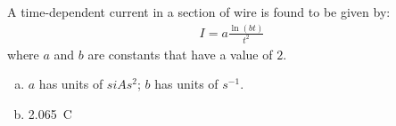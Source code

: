 \question A time-dependent current in a section of wire is found to be given by:
\begin{align*}
I=a\frac{\ln(bt)}{t^2}
\end{align*}  
where $a$ and $b$ are constants that have a value of $2$.
\begin{finalanswer}
\begin{enumerate}[(a)]
\item $a$ has units of $si{As^2}$; $b$ has units of $\si{s^{-1}}$.
\item \SI{2.065}{C}
\end{enumerate}
\end{finalanswer}
